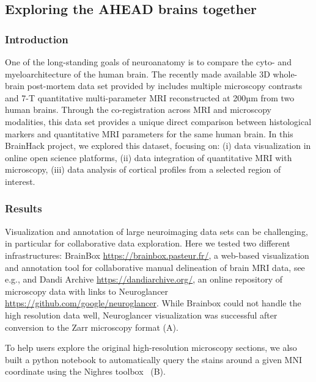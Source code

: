 \documentclass[../main.tex]{subfiles}
\begin{document}
\subsection{Exploring the AHEAD brains together}


\subsubsection{Introduction}
One of the long-standing goals of neuroanatomy is to compare the cyto- and myeloarchitecture of the human brain. The recently made available 3D whole-brain post-mortem data set provided by \textcite{Alkemade2022} includes multiple microscopy contrasts and 7-T quantitative multi-parameter MRI reconstructed at 200µm from two human brains. Through the co-registration across MRI and microscopy modalities, this data set provides a unique direct comparison between histological markers and quantitative MRI parameters for the same human brain. In this BrainHack project, we explored this dataset, focusing on: (i) data visualization in online open science platforms, (ii) data integration of quantitative MRI with microscopy, (iii) data analysis of cortical profiles from a selected region of interest. 


\subsubsection{Results}

Visualization and annotation of large neuroimaging data sets can be challenging, in particular for collaborative data exploration. Here we tested two different infrastructures: BrainBox \url{https://brainbox.pasteur.fr/}, a web-based visualization and annotation tool for collaborative manual delineation of brain MRI data, see e.g.\citep{heuer_evolution_2019}, and Dandi Archive \url{https://dandiarchive.org/}, an online repository of microscopy data with links to Neuroglancer \url{https://github.com/google/neuroglancer}. While Brainbox could not handle the high resolution data well, Neuroglancer visualization was successful after conversion to the Zarr microscopy format (A).

To help users explore the original high-resolution microscopy sections, we also built a python notebook to automatically query the stains around a given MNI coordinate using the Nighres toolbox~\citep{huntenburg_nighres_2018} (B).
\end{document}
